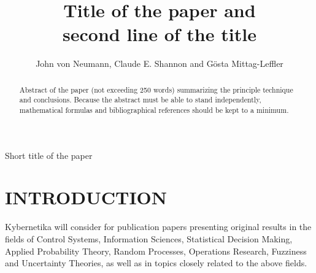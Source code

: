 \documentclass{kybernetika}
\begin{document}
\pagestyle{myheadings}

\title{Title of the paper and\\ second line of the title}

\author{John von Neumann, Claude E. Shannon and G\"{o}sta Mittag-Leffler}


 {Short title of the paper}

\maketitle

\begin{abstract}
Abstract of the paper (not exceeding 250 words) summarizing the principle
technique and conclusions. Because the abstract must be able to stand independently, mathematical formulas and bibliographical references
should be kept to a minimum.
\end{abstract}



\section{INTRODUCTION}
Kybernetika will consider for publication papers presenting original results in the fields of Control Systems, Information Sciences, Statistical Decision Making, Applied Probability Theory, Random Processes, Operations Research, Fuzziness and Uncertainty Theories, as well as in topics closely related to the above fields.
\end{document}
